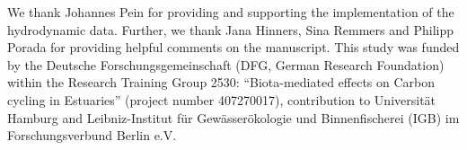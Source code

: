 \documentclass[npg, manuscript]{copernicus}
\begin{document}

\begin{acknowledgements}
We thank Johannes Pein for providing and supporting the implementation of the hydrodynamic data.
Further, we thank Jana Hinners, Sina Remmers and Philipp Porada for providing helpful comments on the manuscript.
This study was funded by the Deutsche Forschungsgemeinschaft (DFG, German Research Foundation) within the Research Training Group 2530: “Biota-mediated effects on Carbon cycling in Estuaries” (project number 407270017), contribution to Universität Hamburg and Leibniz-Institut für Gewässerökologie und Binnenfischerei (IGB) im Forschungsverbund Berlin e.V.
\end{acknowledgements}






  










\end{document}
